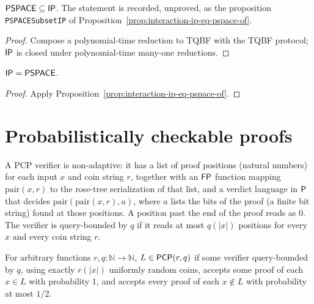 \begin{theorem}
  \label{thm:interaction-pspace-subset-ip}
  $\mathsf{PSPACE} \subseteq \mathsf{IP}$. The statement is recorded, unproved, as the
  proposition \texttt{PSPACESubsetIP} of
  Proposition~\ref{prop:interaction-ip-eq-pspace-of}.
\end{theorem}
\begin{proof}
  Compose a polynomial-time reduction to TQBF with the TQBF protocol; $\mathsf{IP}$
  is closed under polynomial-time many-one reductions.
\end{proof}

\begin{theorem}[$\cc{IP} = \cc{PSPACE}$]
  \label{thm:interaction-ip-eq-pspace}
  $\cc{IP} = \cc{PSPACE}$.
\end{theorem}
\begin{proof}
  Apply Proposition~\ref{prop:interaction-ip-eq-pspace-of}.
\end{proof}

\section{Probabilistically checkable proofs}

\begin{definition}
  \label{def:interaction-pcp-verifier}
  \leanok
  A PCP verifier is non-adaptive: it has a list of proof positions (natural
  numbers) for each input $x$ and coin string $r$, together with an $\mathsf{FP}$
  function mapping $\mathrm{pair}(x, r)$ to the rose-tree serialization of
  that list, and a verdict language in $\mathsf{P}$ that decides
  $\mathrm{pair}(\mathrm{pair}(x, r), a)$, where $a$ lists the bits of the
  proof (a finite bit string) found at those positions. A position past the
  end of the proof reads as $0$. The verifier is query-bounded by $q$ if it
  reads at most $q(|x|)$ positions for every $x$ and every coin string $r$.
\end{definition}

\begin{definition}
  \label{def:PCP}
  \leanok
  For arbitrary functions $r, q : \mathbb{N} \to \mathbb{N}$,
  $L \in \mathsf{PCP}(r, q)$ if some verifier query-bounded by $q$, using exactly
  $r(|x|)$ uniformly random coins, accepts some proof of each $x \in L$ with
  probability $1$, and accepts every proof of each $x \notin L$ with
  probability at most $1/2$.
\end{definition}

